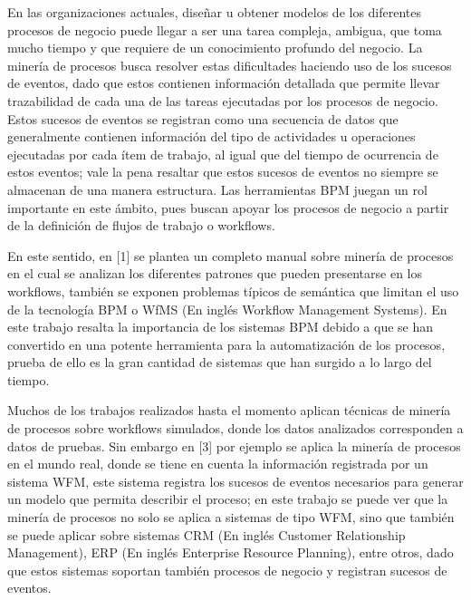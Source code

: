 En las organizaciones actuales, diseñar u obtener modelos de los diferentes procesos de negocio puede llegar a ser una tarea compleja, ambigua, que toma mucho tiempo y que requiere de un conocimiento profundo del negocio. La minería de procesos busca resolver estas dificultades haciendo uso de los sucesos de eventos, dado que estos contienen información detallada que permite llevar trazabilidad de cada una de las tareas ejecutadas por los procesos de negocio. Estos sucesos de eventos se registran como una secuencia de datos que generalmente contienen información del tipo de actividades u operaciones ejecutadas por cada ítem de trabajo, al igual que del tiempo de ocurrencia de estos eventos; vale la pena resaltar que estos sucesos de eventos no siempre se almacenan de una manera estructura. Las herramientas BPM juegan un rol importante en este ámbito, pues buscan apoyar los procesos de negocio a partir de la definición de flujos de trabajo o workflows.

En este sentido, en [1] se plantea un completo manual sobre minería de procesos en el cual se analizan los diferentes patrones que pueden presentarse en los workflows, también se exponen problemas típicos de semántica que limitan el uso de la tecnología BPM o WfMS (En inglés Workflow Management Systems). En este trabajo resalta la importancia de los sistemas BPM debido a que se han convertido en una potente herramienta para la automatización de los procesos, prueba de ello es la gran cantidad de sistemas que han surgido a lo largo del tiempo.

Muchos de los trabajos realizados hasta el momento aplican técnicas de minería de procesos sobre workflows simulados, donde los datos analizados corresponden a datos de pruebas. Sin embargo en [3] por ejemplo se aplica la minería de procesos en el mundo real, donde se tiene en cuenta la información registrada por un sistema WFM, este sistema registra los sucesos de eventos necesarios para generar un modelo que permita describir el proceso; en este trabajo se puede ver que la minería de procesos no solo se aplica a sistemas de tipo WFM, sino que también se puede aplicar sobre sistemas CRM (En inglés Customer Relationship Management), ERP (En inglés Enterprise Resource Planning), entre otros, dado que estos sistemas soportan también procesos de negocio y registran sucesos de eventos.

